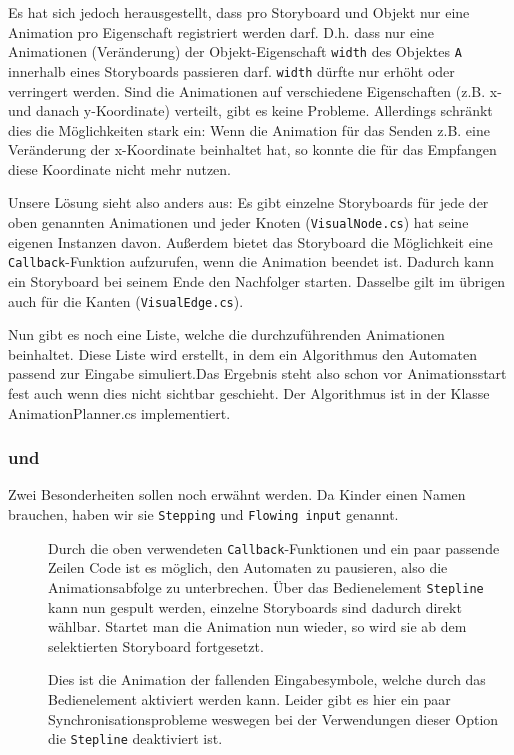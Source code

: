 Es hat sich jedoch herausgestellt, dass pro Storyboard und Objekt nur eine
Animation pro  Eigenschaft registriert werden darf. D.h. dass nur eine
Animationen (Veränderung) der Objekt-Eigenschaft \texttt{width} des Objektes \texttt{A}
innerhalb eines Storyboards passieren darf.  \texttt{width} dürfte nur erhöht oder
verringert werden. Sind die Animationen auf verschiedene Eigenschaften (z.B. x-
und danach y-Koordinate) verteilt, gibt es keine Probleme. Allerdings schränkt
dies die Möglichkeiten stark ein: Wenn die Animation für das Senden z.B. eine
Veränderung der x-Koordinate beinhaltet hat, so konnte die für das Empfangen
diese Koordinate nicht mehr nutzen.

Unsere Lösung sieht also anders aus: Es gibt einzelne Storyboards für jede der
oben genannten Animationen und jeder Knoten (\texttt{VisualNode.cs}) hat seine eigenen
Instanzen davon. Außerdem bietet das Storyboard die Möglichkeit eine
\texttt{Callback}-Funktion aufzurufen, wenn die Animation beendet ist. Dadurch kann ein
Storyboard bei seinem Ende den Nachfolger starten. Dasselbe gilt im übrigen
auch für die Kanten (\texttt{VisualEdge.cs}).

Nun gibt es noch eine Liste, welche die durchzuführenden Animationen
beinhaltet. Diese Liste wird erstellt, in dem ein Algorithmus den Automaten
passend zur Eingabe simuliert.Das Ergebnis steht also schon vor Animationsstart
fest auch wenn dies nicht sichtbar geschieht. Der Algorithmus ist in der Klasse
AnimationPlanner.cs implementiert.

\subsubsection{ und \label{sec:3:3:1}}

Zwei Besonderheiten sollen noch erwähnt werden. Da Kinder einen Namen brauchen,
haben wir sie \texttt{Stepping} und \texttt{Flowing input} genannt.

\begin{description}
	\item [] Durch die oben verwendeten
		\texttt{Callback}-Funktionen und ein paar passende Zeilen Code ist es
		möglich, den Automaten zu pausieren, also die Animationsabfolge zu
		unterbrechen. Über das Bedienelement \texttt{Stepline} kann nun
		\glqq{}gespult\grqq{} werden, einzelne Storyboards sind dadurch direkt
		wählbar. Startet man die Animation nun wieder, so wird sie ab dem
		selektierten Storyboard fortgesetzt.

	\item [] Dies ist die Animation der \glqq{}fallenden\grqq{}
		Eingabesymbole, welche durch das Bedienelement 
		aktiviert werden kann. Leider gibt es hier ein paar
		Synchronisationsprobleme weswegen bei der Verwendungen dieser Option
		die \texttt{Stepline} deaktiviert ist.
\end{description}

